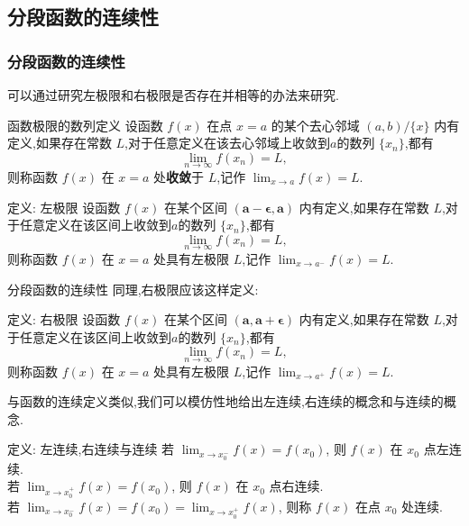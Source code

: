 \documentclass[
10pt,
aspectratio=43,
]{beamer}
\begin{document}
\subsection{分段函数的连续性}
\begin{frame}
	\frametitle{分段函数的连续性}
	可以通过研究左极限和右极限是否存在并相等的办法来研究.
	
	\begin{block}{函数极限的数列定义}
		设函数 $f(x)$ 在点 $x=a$ 的某个去心邻域 $(a,b)/\{x\}$ 内有定义,如果存在常数 $L$,对于任意定义在该去心邻域上收敛到$a$的数列 $\{x_n\}$,都有 
		\begin{equation*}
			\lim_{n\to\infty} f(x_n) = L,
		\end{equation*}
		则称函数 $f(x)$ 在 $x=a$ 处\textbf{收敛}于 $L$,记作 $\lim_{x \to a} f(x) = L$.
	\end{block}
	\begin{block}{定义: 左极限}
		设函数 $f(x)$ 在某个区间 $\bm{(a-\epsilon,a)}$ 内有定义,如果存在常数 $L$,对于任意定义在该区间上收敛到$a$的数列 $\{x_n\}$,都有 
		\begin{equation*}
			\lim_{n\to\infty} f(x_n) = L,
		\end{equation*}
		则称函数 $f(x)$ 在 $x=a$ 处具有左极限 $L$,记作 $\lim_{x \to a^{-}} f(x) = L$.
	\end{block}
\end{frame}

\begin{frame}{分段函数的连续性}
	同理,右极限应该这样定义: 
	\begin{block}{定义: 右极限}
		设函数 $f(x)$ 在某个区间 $\bm{(a,a+\epsilon)}$ 内有定义,如果存在常数 $L$,对于任意定义在该区间上收敛到$a$的数列 $\{x_n\}$,都有 
		\begin{equation*}
			\lim_{n\to\infty} f(x_n) = L,
		\end{equation*}
		则称函数 $f(x)$ 在 $x=a$ 处具有左极限 $L$,记作 $\lim_{x \to a^{+}} f(x) = L$.
	\end{block}
	\pause
	与函数的连续定义类似,我们可以模仿性地给出左连续,右连续的概念和与连续的概念.
	\begin{block}{定义: 左连续,右连续与连续}
		若 $\lim _{x \rightarrow x_0^{-}} f(x)=f\left(x_0\right)$,  则 $f(x)$ 在 $x_0$ 点左连续.\\
		若 $\lim _{x \rightarrow x_0^{+}} f(x)=f\left(x_0\right) $, 则 $f(x)$ 在 $x_0$ 点右连续.\\
		若 $\lim _{x \rightarrow x_0^{-}} f(x)=f\left(x_0\right)=\lim _{x \rightarrow x_0^{+}} f(x)$, 则称 $f(x)$ 在点 $x_0$ 处连续.
	\end{block}
\end{frame}
\end{document}
